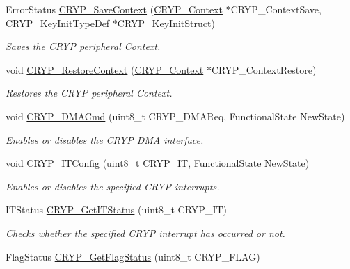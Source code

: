 \begin{DoxyCompactItemize}
Error\-Status \hyperlink{group___c_r_y_p_ga41a14be7fa43d500e7c94cce40910ea8}{C\-R\-Y\-P\-\_\-\-Save\-Context} (\hyperlink{struct_c_r_y_p___context}{C\-R\-Y\-P\-\_\-\-Context} $\ast$C\-R\-Y\-P\-\_\-\-Context\-Save, \hyperlink{struct_c_r_y_p___key_init_type_def}{C\-R\-Y\-P\-\_\-\-Key\-Init\-Type\-Def} $\ast$C\-R\-Y\-P\-\_\-\-Key\-Init\-Struct)
\begin{DoxyCompactList}\small\item\em Saves the C\-R\-Y\-P peripheral Context. \end{DoxyCompactList}\item 
void \hyperlink{group___c_r_y_p_gaf2986782fa66ea95b2a389595e17e0e5}{C\-R\-Y\-P\-\_\-\-Restore\-Context} (\hyperlink{struct_c_r_y_p___context}{C\-R\-Y\-P\-\_\-\-Context} $\ast$C\-R\-Y\-P\-\_\-\-Context\-Restore)
\begin{DoxyCompactList}\small\item\em Restores the C\-R\-Y\-P peripheral Context. \end{DoxyCompactList}\item 
void \hyperlink{group___c_r_y_p_ga111d0ec56facb27f8367ce6a33869115}{C\-R\-Y\-P\-\_\-\-D\-M\-A\-Cmd} (uint8\-\_\-t C\-R\-Y\-P\-\_\-\-D\-M\-A\-Req, Functional\-State New\-State)
\begin{DoxyCompactList}\small\item\em Enables or disables the C\-R\-Y\-P D\-M\-A interface. \end{DoxyCompactList}\item 
void \hyperlink{group___c_r_y_p_gafbf5ee5f2c3ae4404149a994e15b33d8}{C\-R\-Y\-P\-\_\-\-I\-T\-Config} (uint8\-\_\-t C\-R\-Y\-P\-\_\-\-I\-T, Functional\-State New\-State)
\begin{DoxyCompactList}\small\item\em Enables or disables the specified C\-R\-Y\-P interrupts. \end{DoxyCompactList}\item 
I\-T\-Status \hyperlink{group___c_r_y_p_ga00a48b748ed127fa517cacec9dbf18f4}{C\-R\-Y\-P\-\_\-\-Get\-I\-T\-Status} (uint8\-\_\-t C\-R\-Y\-P\-\_\-\-I\-T)
\begin{DoxyCompactList}\small\item\em Checks whether the specified C\-R\-Y\-P interrupt has occurred or not. \end{DoxyCompactList}\item 
Flag\-Status \hyperlink{group___c_r_y_p_ga993d568b626a74b2973d4a6848a681f6}{C\-R\-Y\-P\-\_\-\-Get\-Flag\-Status} (uint8\-\_\-t C\-R\-Y\-P\-\_\-\-F\-L\-A\-G)

\end{DoxyCompactItemize}
